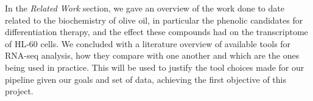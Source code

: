 In the \textit{Related Work} section, we gave an overview of the work done to date related to the biochemistry of olive oil, in particular the phenolic candidates for differentiation therapy, and the effect these compounds had on the transcriptome of HL-60 cells. We concluded with a literature overview of available tools for RNA-seq analysis, how they compare with one another and which are the ones being used in practice. This will be used to justify the tool choices made for our pipeline given our goals and set of data, achieving the first objective of this project.




